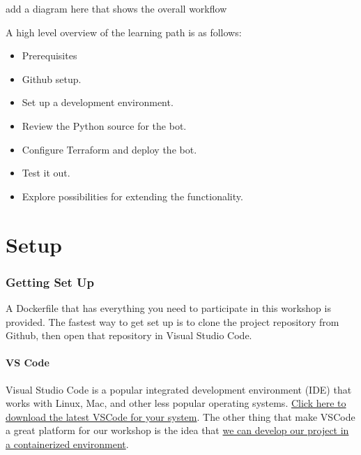 add a diagram here that shows the overall workflow

\justifying
A high level overview of the learning path is as follows:

\begin{raggedright}
	\begin{itemize}
		\item Prerequisites
		\item Github setup.
		\item Set up a development environment.
		\item Review the Python source for the bot.
		\item Configure Terraform and deploy the bot.
		\item Test it out.
		\item Explore possibilities for extending the functionality.
	\end{itemize}
\end{raggedright}
\vspace{2mm}

\clearpage
\part{Setup}

\section{\label{sec:preparation}Getting Set Up}

\justifying
A Dockerfile that has everything you need to participate in this workshop is provided. The fastest way to get set up is to clone the project
repository from Github, then open that repository in Visual Studio Code.
\vspace{2mm}

\subsection{\label{sec:dev-linux}VS Code}

\justifying
Visual Studio Code is a popular integrated development environment (IDE) that works with Linux, Mac, and other less popular operating
systems. \href{https://code.visualstudio.com/download}{Click here to download the latest VSCode for your system}. The other thing that
make VSCode a great platform for our workshop is the idea that \href{https://code.visualstudio.com/docs/devcontainers/containers}{we can develop our project in a containerized environment}.
\vspace{2mm}

